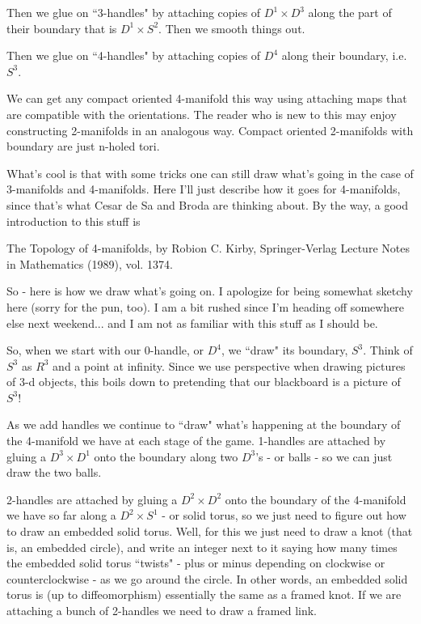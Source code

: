 Then we glue on ``3-handles" by attaching copies of $D^1 \times D^3$ along the part of their boundary that is $D^1 \times S^2$. Then we smooth things out.

Then we glue on ``4-handles" by attaching copies of $D^4$ along their boundary, i.e. $S^3$.

We can get any compact oriented 4-manifold this way using attaching maps that are compatible with the orientations. The reader who is new to this may enjoy constructing 2-manifolds in an analogous way. Compact oriented 2-manifolds with boundary are just n-holed tori.

What's cool is that with some tricks one can still draw what's going in the case of 3-manifolds and 4-manifolds. Here I'll just describe how it goes for 4-manifolds, since that's what Cesar de Sa and Broda are thinking about. By the way, a good introduction to this stuff is

The Topology of 4-manifolds, by Robion C. Kirby, Springer-Verlag Lecture Notes in Mathematics (1989), vol. 1374.

So - here is how we draw what's going on. I apologize for being somewhat sketchy here (sorry for the pun, too). I am a bit rushed since I'm heading off somewhere else next weekend... and I am not as familiar with this stuff as I should be.

So, when we start with our 0-handle, or $D^4$, we ``draw" its boundary, $S^3$. Think of $S^3$ as $R^3$ and a point at infinity. Since we use perspective when drawing pictures of 3-d objects, this boils down to pretending that our blackboard is a picture of $S^3$!

As we add handles we continue to ``draw" what's happening at the boundary of the 4-manifold we have at each stage of the game. 1-handles are attached by gluing a $D^3 \times D^1$ onto the boundary along two $D^3$'s - or balls - so we can just draw the two balls.

2-handles are attached by gluing a $D^2 \times D^2$ onto the boundary of the 4-manifold we have so far along a $D^2 \times S^1$ - or solid torus, so we just need to figure out how to draw an embedded solid torus. Well, for this we just need to draw a knot (that is, an embedded circle), and write an integer next to it saying how many times the embedded solid torus ``twists" - plus or minus depending on clockwise or counterclockwise - as we go around the circle. In other words, an embedded solid torus is (up to diffeomorphism) essentially the same as a framed knot. If we are attaching a bunch of 2-handles we need to draw a framed link.

